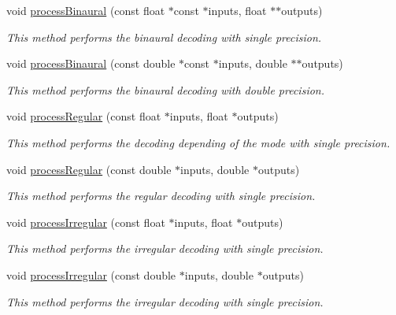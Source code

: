 \begin{DoxyCompactItemize}
void \hyperlink{class_hoa2_d_1_1_decoder_multi_a215385080edb593cb2d8c0e7124d0c00}{process\-Binaural} (const float $\ast$const $\ast$inputs, float $\ast$$\ast$outputs)
\begin{DoxyCompactList}\small\item\em This method performs the binaural decoding with single precision. \end{DoxyCompactList}\item 
void \hyperlink{class_hoa2_d_1_1_decoder_multi_ac2aed267552cfa2535156742529bfa54}{process\-Binaural} (const double $\ast$const $\ast$inputs, double $\ast$$\ast$outputs)
\begin{DoxyCompactList}\small\item\em This method performs the binaural decoding with double precision. \end{DoxyCompactList}\item 
void \hyperlink{class_hoa2_d_1_1_decoder_multi_a7d4d1130db9e008e178a4210571d9f97}{process\-Regular} (const float $\ast$inputs, float $\ast$outputs)
\begin{DoxyCompactList}\small\item\em This method performs the decoding depending of the mode with single precision. \end{DoxyCompactList}\item 
void \hyperlink{class_hoa2_d_1_1_decoder_multi_a594583b4853dcabf5f655412faad0fe7}{process\-Regular} (const double $\ast$inputs, double $\ast$outputs)
\begin{DoxyCompactList}\small\item\em This method performs the regular decoding with single precision. \end{DoxyCompactList}\item 
void \hyperlink{class_hoa2_d_1_1_decoder_multi_ae7b3be8b1b39a2242a4a270d5278a4f6}{process\-Irregular} (const float $\ast$inputs, float $\ast$outputs)
\begin{DoxyCompactList}\small\item\em This method performs the irregular decoding with single precision. \end{DoxyCompactList}\item 
void \hyperlink{class_hoa2_d_1_1_decoder_multi_a11493b383a19d621202acebb17568000}{process\-Irregular} (const double $\ast$inputs, double $\ast$outputs)
\begin{DoxyCompactList}\small\item\em This method performs the irregular decoding with single precision. \end{DoxyCompactList}\end{DoxyCompactItemize}
